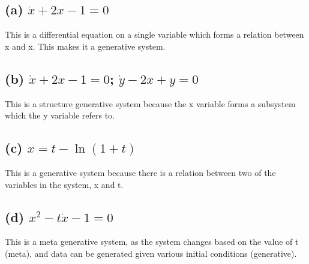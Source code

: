 \documentclass[12pt]{article}
\begin{document}
\subsection{(a) $\dot{x}+2x-1=0$}

This is a differential equation on a single variable which forms a relation between x and x.  This makes it a generative system.

\subsection{(b) $\dot{x}+2x-1=0$; $\dot{y}-2x+y=0$}

This is a structure generative system because the x variable forms a subsystem which the y variable refers to.  

\subsection{(c) $x=t-\ln{(1+t)}$}

This is a generative system because there is a relation between two of the variables in the system, x and t.  

\subsection{(d) $x^2-t\dot{x}-1=0$}

This is a meta generative system, as the system changes based on the value of t (meta), and data can be generated given various initial conditions (generative).  
\end{document}
